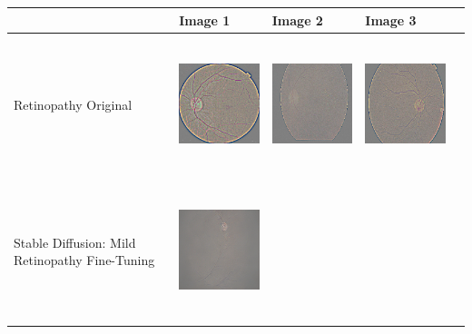 
\begin{table}[H]
\centering
\begin{tabularx}{\linewidth}{@{}>{\centering\arraybackslash}m{3cm}>{\centering\arraybackslash}X>{\centering\arraybackslash}X>{\centering\arraybackslash}X>{\centering\arraybackslash}X@{}}
\toprule
 & Image 1 & Image 2 & Image 3 \\
\midrule
Retinopathy Original &
\includegraphics[valign=M,width=\linewidth,height=4cm,keepaspectratio]{main/content/images/retinopatia_dreambooth_comparison/real/2.png} & 
\includegraphics[valign=M,width=\linewidth,height=4cm,keepaspectratio]{main/content/images/retinopatia_dreambooth_comparison/real/3.png} & 
\includegraphics[valign=M,width=\linewidth,height=4cm,keepaspectratio]{main/content/images/retinopatia_dreambooth_comparison/real/9.png} \\
\midrule
Stable Diffusion: Mild Retinopathy Fine-Tuning & 
\includegraphics[valign=M,width=\linewidth,height=4cm,keepaspectratio]{main/content/images/retinopatia_dreambooth_comparison/synthetic/104.png} & 

\end{tabularx}
\end{table}
